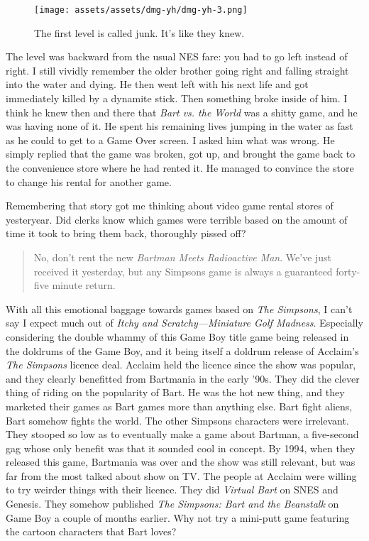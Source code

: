 \documentclass{book}
\begin{document}
\begin{figure}[hbt]
\vskip 10pt
\centering \texttt{[image: assets/assets/dmg-yh/dmg-yh-3.png]}\par\pagetwodescription The first level is called junk. It’s like they knew.
\vskip 6pt
\end{figure}

The level was backward from the usual NES fare: you had to go left instead of right. I still vividly remember the older brother going right and falling straight into the water and dying. He then went left with his next life and got immediately killed by a dynamite stick. Then something broke inside of him. I think he knew then and there that \emph{Bart vs. the World} was a shitty game, and he was having none of it. He spent his remaining lives jumping in the water as fast as he could to get to a Game Over screen. I asked him what was wrong. He simply replied that the game was broken, got up, and brought the game back to the convenience store where he had rented it. He managed to convince the store to change his rental for another game.

Remembering that story got me thinking about video game rental stores of yesteryear. Did clerks know which games were terrible based on the amount of time it took to bring them back, thoroughly pissed off?

\begin{quote}
No, don’t rent the new \emph{Bartman Meets Radioactive Man}. We’ve just received it yesterday, but any Simpsons game is always a guaranteed forty-five minute return.
\end{quote} \par

With all this emotional baggage towards games based on \emph{The Simpsons}, I can’t say I expect much out of \emph{Itchy and Scratchy—Miniature Golf Madness}. Especially considering the double whammy of this Game Boy title game being released in the doldrums of the Game Boy, and it being itself a doldrum release of Acclaim’s \emph{The Simpsons} licence deal. Acclaim held the licence since the show was popular, and they clearly benefitted from Bartmania in the early ’90s. They did the clever thing of riding on the popularity of Bart. He was the hot new thing, and they marketed their games as Bart games more than anything else. Bart fight aliens, Bart somehow fights the world. The other Simpsons characters were irrelevant. They stooped so low as to eventually make a game about Bartman, a five-second gag whose only benefit was that it sounded cool in concept. By 1994, when they released this game, Bartmania was over and the show was still relevant, but was far from the most talked about show on TV. The people at Acclaim were willing to try weirder things with their licence. They did \emph{Virtual Bart} on SNES and Genesis. They somehow published \emph{The Simpsons: Bart and the Beanstalk} on Game Boy a couple of months earlier. Why not try a mini-putt game featuring the cartoon characters that Bart loves?
\end{document}

